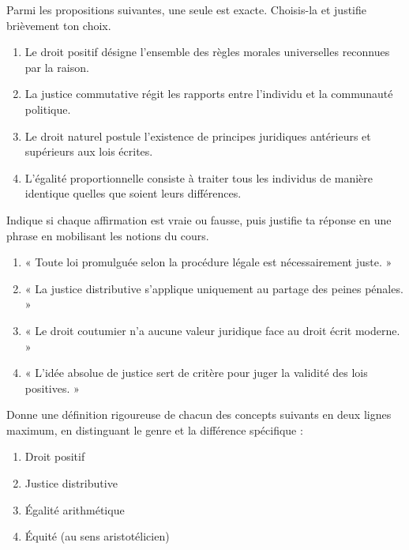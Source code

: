\documentclass[11pt]{article}
\begin{document}
\begin{exercice}
Parmi les propositions suivantes, une seule est exacte. Choisis-la et justifie brièvement ton choix.
\begin{enumerate}
\item Le droit positif désigne l'ensemble des règles morales universelles reconnues par la raison.
\item La justice commutative régit les rapports entre l'individu et la communauté politique.
\item Le droit naturel postule l'existence de principes juridiques antérieurs et supérieurs aux lois écrites.
\item L'égalité proportionnelle consiste à traiter tous les individus de manière identique quelles que soient leurs différences.
\end{enumerate}
\end{exercice}

\begin{exercice}
Indique si chaque affirmation est vraie ou fausse, puis justifie ta réponse en une phrase en mobilisant les notions du cours.
\begin{enumerate}
\item « Toute loi promulguée selon la procédure légale est nécessairement juste. »
\item « La justice distributive s'applique uniquement au partage des peines pénales. »
\item « Le droit coutumier n'a aucune valeur juridique face au droit écrit moderne. »
\item « L'idée absolue de justice sert de critère pour juger la validité des lois positives. »
\end{enumerate}
\end{exercice}

\begin{exercice}
Donne une définition rigoureuse de chacun des concepts suivants en deux lignes maximum, en distinguant le genre et la différence spécifique :
\begin{enumerate}
\item Droit positif
\item Justice distributive
\item Égalité arithmétique
\item Équité (au sens aristotélicien)
\end{enumerate}
\end{exercice}
\end{document}
